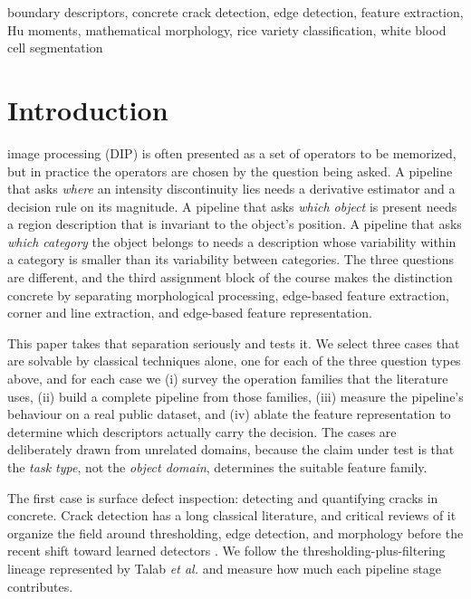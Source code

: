 \documentclass{ieeeaccess}
\begin{document}
\begin{keywords}
boundary descriptors, concrete crack detection, edge detection, feature
extraction, Hu moments, mathematical morphology, rice variety classification,
white blood cell segmentation
\end{keywords}

\titlepgskip=-15pt

\maketitle

\section{Introduction}
\label{sec:intro}
 image processing (DIP) is often presented as a set of
operators to be memorized, but in practice the operators are chosen by the
question being asked. A pipeline that asks \emph{where} an intensity
discontinuity lies needs a derivative estimator and a decision rule on its
magnitude. A pipeline that asks \emph{which object} is present needs a region
description that is invariant to the object's position. A pipeline that asks
\emph{which category} the object belongs to needs a description whose variability
within a category is smaller than its variability between categories. The three
questions are different, and the third assignment block of the course makes the
distinction concrete by separating morphological processing, edge-based feature
extraction, corner and line extraction, and edge-based feature representation.

This paper takes that separation seriously and tests it. We select three cases
that are solvable by classical techniques alone, one for each of the three
question types above, and for each case we (i) survey the operation families
that the literature uses, (ii) build a complete pipeline from those families,
(iii) measure the pipeline's behaviour on a real public dataset, and (iv)
ablate the feature representation to determine which descriptors actually carry
the decision. The cases are deliberately drawn from unrelated domains, because
the claim under test is that the \emph{task type}, not the \emph{object domain},
determines the suitable feature family.

The first case is surface defect inspection: detecting and quantifying cracks in
concrete. Crack detection has a long classical literature, and critical reviews
of it organize the field around thresholding, edge detection, and morphology
before the recent shift toward learned detectors \cite{mohan2018}. We follow the
thresholding-plus-filtering lineage represented by Talab \emph{et al.}
\cite{talab2016} and measure how much each pipeline stage contributes.
\end{document}
